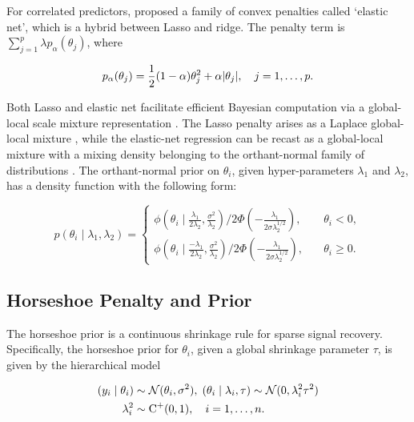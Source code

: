 \documentclass[sts,preprint]{imsart}
\begin{document}
For correlated predictors, \cite{zou2005regularization} proposed a family of convex penalties called `elastic net', which is a hybrid between Lasso and ridge. The penalty term is $\sum_{j=1}^{p} \lambda p_{\alpha}(\theta_j)$, where 

\[
p_{\alpha}(\theta_j) = \frac{1}{2} (1-\alpha)\theta_j^2 + \alpha \lvert\theta_j\rvert, \quad j = 1, \ldots, p. 
\]

Both Lasso and elastic net facilitate efficient Bayesian computation via a global-local scale mixture representation \citep{bhadra2016global}. The Lasso penalty arises as a Laplace global-local mixture \citep{andrews1974scale}, while the elastic-net regression can be recast as a global-local mixture with a mixing density belonging to the orthant-normal family of distributions
\citep{hans2011elastic}.  The orthant-normal prior on $\theta_i$, given hyper-parameters $\lambda_1$ and $\lambda_2$, has a density function with the following form:

\begin{equation}
  p(\theta_i \mid \lambda_1, \lambda_2)  = 
  \begin{cases} 
   \phi(\theta_i \mid \frac{\lambda_1}{2\lambda_2}, \frac{\sigma^2}{\lambda_2}) / 2\Phi\left(-\frac{\lambda_1}{2\sigma \lambda_2^{1/2} }\right), & \quad \theta_i < 0, \\
   \phi(\theta_i \mid \frac{-\lambda_1}{2\lambda_2}, \frac{\sigma^2}{\lambda_2}) / 2\Phi\left(-\frac{\lambda_1}{2\sigma \lambda_2^{1/2} }\right), & \quad \theta_i \geq 0. \end{cases} 
  \label{eq:hans}
\end{equation}


\subsection{Horseshoe Penalty and Prior}\label{sec:one-gp}

The horseshoe prior is a continuous shrinkage rule for sparse signal recovery. Specifically, the horseshoe prior for $\theta_i$, given a global shrinkage parameter $\tau$, is given by the hierarchical model 

\begin{align}
  (y_i \mid \theta_i) & \sim {\cal N}(\theta_i , \sigma^2),\;
  (\theta_i \mid \lambda_i, \tau) \sim 
  {\cal N}(0, \lambda_i^2 \tau^2) \nonumber \\ \lambda_i ^2 &
  \sim \operatorname{C}^{+}(0,1), \quad i = 1, \ldots, n. 
  \label{eq:hs}
\end{align}
\end{document}
